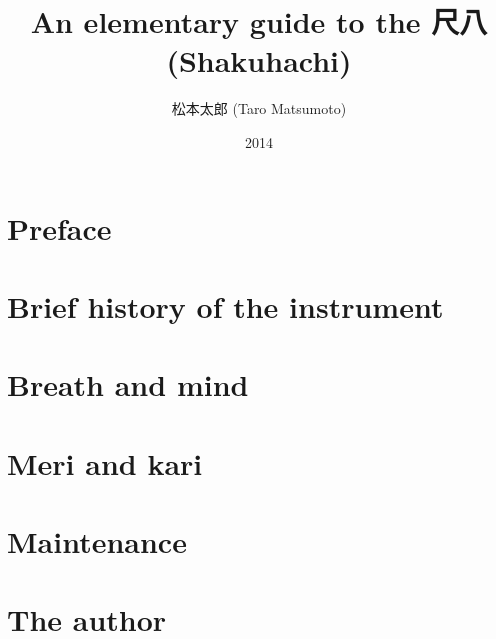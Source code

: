 \documentclass[b5paper,draft]{memoir}
\begin{document}
\frontmatter

\title{An elementary guide to the 尺八 (Shakuhachi)}
\author{松本太郎 (Taro Matsumoto)}
\date{2014}
\maketitle

\newpage

\section{Preface}


\clearpage

\tableofcontents

\mainmatter

\section{Brief history of the instrument}


\section{Breath and mind}


\section{Meri and kari}


\section{Maintenance}


\backmatter

\section{The author}

\end{document}
